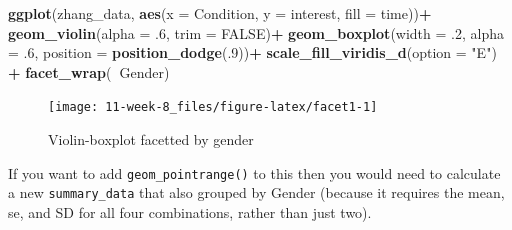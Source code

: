 \documentclass[]{book}
\newenvironment{Shaded}{\begin{snugshade}}{\end{snugshade}}
\newcommand{\DataTypeTok}[1]{\textcolor[rgb]{0.13,0.29,0.53}{#1}}
\newcommand{\DecValTok}[1]{\textcolor[rgb]{0.00,0.00,0.81}{#1}}
\newcommand{\FloatTok}[1]{\textcolor[rgb]{0.00,0.00,0.81}{#1}}
\newcommand{\KeywordTok}[1]{\textcolor[rgb]{0.13,0.29,0.53}{\textbf{#1}}}
\newcommand{\NormalTok}[1]{#1}
\newcommand{\OperatorTok}[1]{\textcolor[rgb]{0.81,0.36,0.00}{\textbf{#1}}}
\newcommand{\OtherTok}[1]{\textcolor[rgb]{0.56,0.35,0.01}{#1}}
\newcommand{\StringTok}[1]{\textcolor[rgb]{0.31,0.60,0.02}{#1}}
\begin{document}
\begin{Shaded}
\begin{Highlighting}[]
\KeywordTok{ggplot}\NormalTok{(zhang_data, }\KeywordTok{aes}\NormalTok{(}\DataTypeTok{x =}\NormalTok{ Condition, }\DataTypeTok{y =}\NormalTok{ interest, }\DataTypeTok{fill =}\NormalTok{ time))}\OperatorTok{+}
\StringTok{  }\KeywordTok{geom_violin}\NormalTok{(}\DataTypeTok{alpha =} \FloatTok{.6}\NormalTok{, }\DataTypeTok{trim =} \OtherTok{FALSE}\NormalTok{)}\OperatorTok{+}
\StringTok{  }\KeywordTok{geom_boxplot}\NormalTok{(}\DataTypeTok{width =} \FloatTok{.2}\NormalTok{, }\DataTypeTok{alpha =} \FloatTok{.6}\NormalTok{, }\DataTypeTok{position =} \KeywordTok{position_dodge}\NormalTok{(.}\DecValTok{9}\NormalTok{))}\OperatorTok{+}
\StringTok{  }\KeywordTok{scale_fill_viridis_d}\NormalTok{(}\DataTypeTok{option =} \StringTok{"E"}\NormalTok{) }\OperatorTok{+}
\StringTok{  }\KeywordTok{facet_wrap}\NormalTok{(}\OperatorTok{~}\NormalTok{Gender)}
\end{Highlighting}
\end{Shaded}

\begin{figure}

{\centering \texttt{[image: 11-week-8\_files/figure-latex/facet1-1]} 

}

\caption{Violin-boxplot facetted by gender}\label{fig:facet1}
\end{figure}

If you want to add \texttt{geom\_pointrange()} to this then you would need to calculate a new \texttt{summary\_data} that also grouped by Gender (because it requires the mean, se, and SD for all four combinations, rather than just two).
\end{document}

